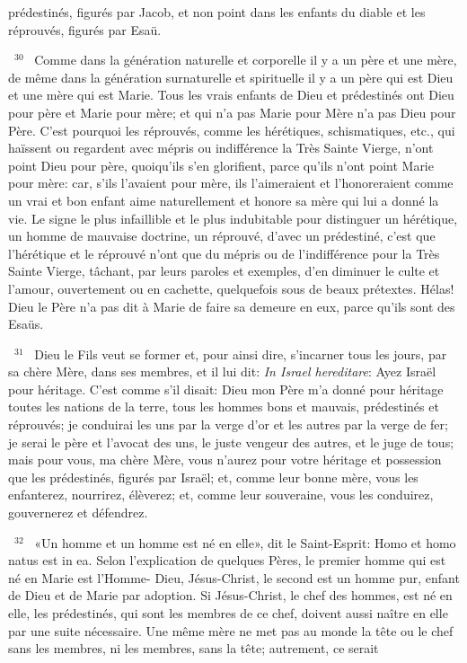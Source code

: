 \documentclass[paper=a5,pagesize=pdftex,fontsize=15pt,headinclude=on,twoside=off]{scrbook}
\newcommand{\negphantom}[1]{\settowidth{\dimen0}{#1}\hspace*{-\dimen0}}
\newcommand{\versenb}[1]{\par \vspace{10pt}~\negphantom{~${}^{#1}$~}${}^{#1}$~}
\newcommand{\latin}[1]{\emph{#1}}
\begin{document}
prédestinés, figurés par Jacob, et non point dans les enfants du diable et les réprouvés, figurés par Esaü.
\versenb{30} Comme dans la génération naturelle et corporelle il y a un père et une mère, de même dans la génération
surnaturelle et spirituelle il y a un père qui est Dieu et une mère qui est Marie. Tous les vrais enfants de Dieu et
prédestinés ont Dieu pour père et Marie pour mère; et qui n'a pas Marie pour Mère n'a pas Dieu pour Père. C'est
pourquoi les réprouvés, comme les hérétiques, schismatiques, etc., qui haïssent ou regardent avec mépris ou
indifférence la Très Sainte Vierge, n'ont point Dieu pour père, quoiqu'ils s'en glorifient, parce qu'ils n'ont point Marie
pour mère: car, s'ils l'avaient pour mère, ils l'aimeraient et l'honoreraient comme un vrai et bon enfant aime
naturellement et honore sa mère qui lui a donné la vie.
Le signe le plus infaillible et le plus indubitable pour distinguer un hérétique, un homme de mauvaise doctrine, un
réprouvé, d'avec un prédestiné, c'est que l'hérétique et le réprouvé n'ont que du mépris ou de l'indifférence pour la
Très Sainte Vierge, tâchant, par leurs paroles et exemples, d'en diminuer le culte et l'amour, ouvertement ou en
cachette, quelquefois sous de beaux prétextes. Hélas! Dieu le Père n'a pas dit à Marie de faire sa demeure en
eux, parce qu'ils sont des Esaüs.
\versenb{31} Dieu le Fils veut se former et, pour ainsi dire, s'incarner tous les jours, par sa chère Mère, dans ses membres,
et il lui dit: \latin{In Israel hereditare}: Ayez Israël pour héritage. C'est comme s'il disait: Dieu mon Père m'a donné pour
héritage toutes les nations de la terre, tous les hommes bons et mauvais, prédestinés et réprouvés; je conduirai les
uns par la verge d'or et les autres par la verge de fer; je serai le père et l'avocat des uns, le juste vengeur des
autres, et le juge de tous; mais pour vous, ma chère Mère, vous n'aurez pour votre héritage et possession que les
prédestinés, figurés par Israël; et, comme leur bonne mère, vous les enfanterez, nourrirez, élèverez; et, comme
leur souveraine, vous les conduirez, gouvernerez et défendrez.
\versenb{32} «Un homme et un homme est né en elle», dit le Saint-Esprit: Homo et homo natus est in ea. Selon l'explication
de quelques Pères, le premier homme qui est né en Marie est l'Homme- Dieu, Jésus-Christ, le second est un
homme pur, enfant de Dieu et de Marie par adoption. Si Jésus-Christ, le chef des hommes, est né en elle, les
prédestinés, qui sont les membres de ce chef, doivent aussi naître en elle par une suite nécessaire. Une même
mère ne met pas au monde la tête ou le chef sans les membres, ni les membres, sans la tête; autrement, ce serait
\end{document}
